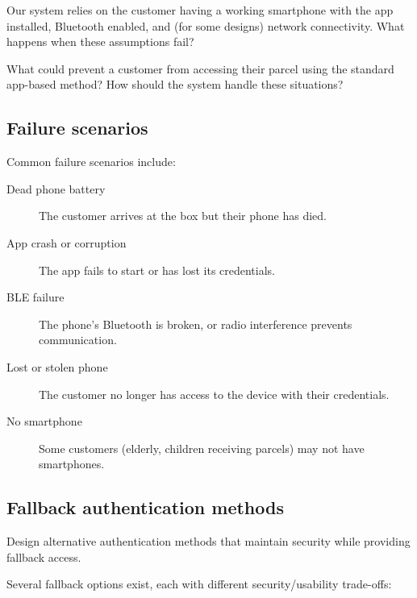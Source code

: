 Our system relies on the customer having a working smartphone with the app 
installed, Bluetooth enabled, and (for some designs) network connectivity.
What happens when these assumptions fail?

\begin{exercise}
  What could prevent a customer from accessing their parcel using the standard 
  app-based method?
  How should the system handle these situations?
\end{exercise}

\subsection{Failure scenarios}

Common failure scenarios include:
\begin{description}
  \item[Dead phone battery] The customer arrives at the box but their phone has 
    died.
  \item[App crash or corruption] The app fails to start or has lost its 
    credentials.
  \item[BLE failure] The phone's Bluetooth is broken, or radio interference 
    prevents communication.
  \item[Lost or stolen phone] The customer no longer has access to the device 
    with their credentials.
  \item[No smartphone] Some customers (elderly, children receiving parcels) may 
    not have smartphones.
\end{description}

\subsection{Fallback authentication methods}

\begin{exercise}
  Design alternative authentication methods that maintain security while 
  providing fallback access.
\end{exercise}

Several fallback options exist, each with different security/usability 
trade-offs:


